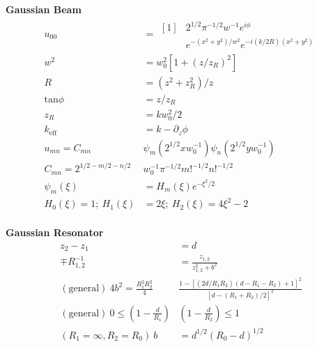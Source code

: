 \documentclass[12pt]{article}
\begin{document}
\begin{multicols}{2}
\textbf{Gaussian Beam}
\begin{align}
  u_{00} &= \begin{aligned}[1]
    &2^{1/2}\pi^{-1/2}w^{-1}e^{i\phi}\\
    &e^{-(x^2+y^2)/w^2}e^{-i(k/2R)(x^2+y^2)}
  \end{aligned}\\
  w^2 &= w_0^2[1+{(z/z_R)}^2]\\
  R &= (z^2 + z_R^2) / z\\
  \textrm{tan}\phi &= z/z_R\\
  z_R &= k w_0^2 / 2\\
  k_{\textrm{eff}} &= k - \partial_z \phi\\
  u_{mn} = C_{mn}&\psi_m(2^{1/2}xw_0^{-1})\psi_n(2^{1/2}yw_0^{-1})\\
  C_{mn} = 2^{1/2 -m/2 -n/2} &w_0^{-1} \pi^{-1/2} m!^{-1/2} n!^{-1/2}\\
  \psi_m(\xi) &= H_m(\xi)e^{-\xi^2/2}\\
  H_0(\xi) = 1; \ H_1(\xi) &= 2\xi; \ H_2(\xi) = 4\xi^2 - 2\\
\end{align}

\textbf{Gaussian Resonator}
\begin{align}
  z_2 - z_1 &= d\\
  \mp R_{1,2}^{-1} &= \frac{z_{1,2}}{z_{1,2}^2 + b^2}\\
  (\textrm{general}) \ 4b^2 = \frac{R_1^2 R_2^2}{4} &\frac{1 - [(2d/R_1R_2)(d-R_1-R_2)+1]^2}
  {[d - (R_1 + R_2)/2]^2}\\
  (\textrm{general}) \ 0 \leq (1 - \frac{d}{R_1})&(1 - \frac{d}{R_2}) \leq 1\\
  (R_1 = \infty, R_2 = R_0) \ b &= d^{1/2}(R_0 - d)^{1/2}
\end{align}


\end{multicols}
\end{document}

